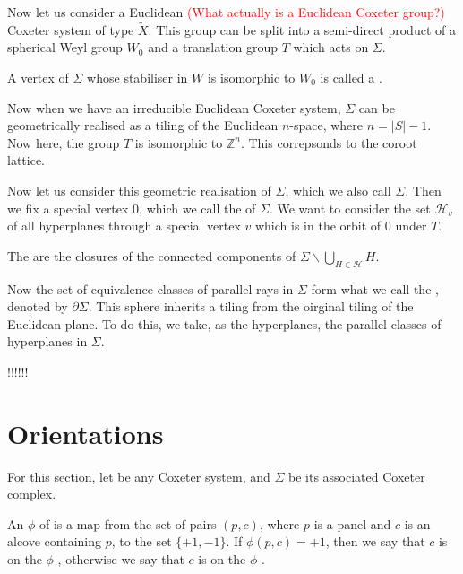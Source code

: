 \documentclass[12pt]{article}
\begin{document}
Now let us consider a Euclidean \textcolor{red}{(What actually is a Euclidean Coxeter group?)} Coxeter system of type $\tilde{X}$. This group can be split into a semi-direct product of a spherical Weyl group $W_0$ and a translation group $T$ which acts on $\Sigma$.
\begin{definition}
    A vertex of $\Sigma$ whose stabiliser in $W$ is isomorphic to $W_0$ is called a .
\end{definition}

Now when we have an irreducible Euclidean Coxeter system, $\Sigma$ can be geometrically realised as a tiling of the Euclidean $n$-space, where $n=|S|-1$. Now here, the group $T$ is isomorphic to $\mathbb{Z}^n$. This correpsonds to the coroot lattice. 

Now let us consider this geometric realisation of $\Sigma$, which we also call $\Sigma$. Then we fix a special vertex 0, which we call the  of $\Sigma$. We want to consider the set $\mathcal{H}_v$ of all hyperplanes through a special vertex $v$ which is in the orbit of 0 under $T$. 

\begin{definition}
    The  are the closures of the connected components of $\Sigma\backslash \bigcup_{H\in\mathcal{H}}H$.
\end{definition}

Now the set of equivalence classes of parallel rays in $\Sigma$ form what we call the , denoted by $\partial\Sigma$. This sphere inherits a tiling from the oirginal tiling of the Euclidean plane. To do this, we take, as the hyperplanes, the parallel classes of hyperplanes in $\Sigma$. 





!!!!!!


\section{Orientations}

For this section, let \W be any Coxeter system, and $\Sigma$ be its associated Coxeter complex.

\begin{definition}
    An  $\phi$ of \sg is a map from the set of pairs $(p,c)$, where $p$ is a panel and $c$ is an alcove containing $p$, to the set $\{+1,-1\}$. If $\phi (p,c)=+1$, then we say that $c$ is on the $\phi$-, otherwise we say that $c$ is on the $\phi$-. 
\end{definition}
\end{document}
